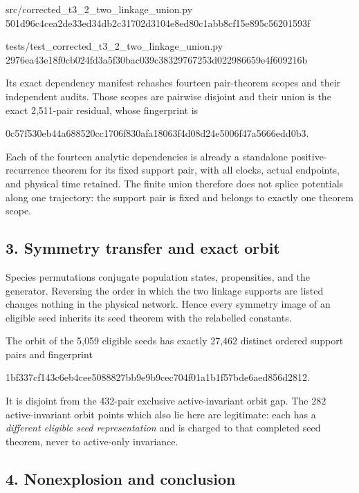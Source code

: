 \begin{CodeBlock}
src/corrected_t3_2_two_linkage_union.py
501d96c4cea2de33ed34db2c31702d3104e8ed80c1abb8cf15e895c56201593f

tests/test_corrected_t3_2_two_linkage_union.py
2976ea43e18f0cb024fd3a5f30bac039c38329767253d022986659e4f609216b
\end{CodeBlock}

Its exact dependency manifest rehashes fourteen pair-theorem scopes and
their independent audits. Those scopes are pairwise disjoint and their
union is the exact 2,511-pair residual, whose fingerprint is

\begin{CodeBlock}
0c57f530eb44a688520cc1706f830afa18063f4d08d24e5006f47a5666edd0b3.
\end{CodeBlock}

Each of the fourteen analytic dependencies is already a standalone
positive-recurrence theorem for its fixed support pair, with all clocks,
actual endpoints, and physical time retained. The finite union therefore
does not splice potentials along one trajectory: the support pair is
fixed and belongs to exactly one theorem scope.

\subsection{3. Symmetry transfer and exact
orbit}

Species permutations conjugate population states, propensities, and the
generator. Reversing the order in which the two linkage supports are
listed changes nothing in the physical network. Hence every symmetry
image of an eligible seed inherits its seed theorem with the relabelled
constants.

The orbit of the 5,059 eligible seeds has exactly 27,462 distinct
ordered support pairs and fingerprint

\begin{CodeBlock}
1bf337cf143c6eb4cee5088827bb9e9b9cec704f01a1b1f57bde6aed856d2812.
\end{CodeBlock}

It is disjoint from the 432-pair exclusive active-invariant orbit gap.
The 282 active-invariant orbit points which also lie here are
legitimate: each has a \emph{different eligible seed representation} and
is charged to that completed seed theorem, never to active-only
invariance.

\subsection{4. Nonexplosion and
conclusion}

